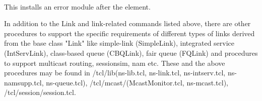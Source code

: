 \begin{flushleft}
\\
This installs an error module after the  element.


In addition to the Link and link-related commands listed above, there are
other procedures to support the specific requirements of different types of
links derived from the base class "Link" like simple-link (SimpleLink),
integrated service (IntServLink), class-based queue (CBQLink), fair queue
(FQLink) and procedures to support multicast routing, sessionsim, nam etc.
These and the above procedures may be found in \ns/tcl/lib(ns-lib.tcl,
ns-link.tcl, ns-intserv.tcl, ns-namsupp.tcl, ns-queue.tcl),
\ns/tcl/mcast/(McastMonitor.tcl, ns-mcast.tcl), 
\ns/tcl/session/session.tcl.

\end{flushleft}
